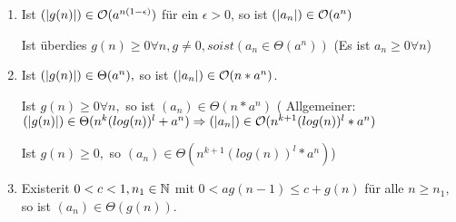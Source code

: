 \begin{enumerate}
	\item Ist $(\left|g(n)\right|) \in \mathcal{O}(a^{n(1-\epsilon)})$ für ein $ \epsilon > 0$, so ist $(\left|a_n\right|) \in \mathcal{O}(a^n)$ 
	
	Ist überdies $g(n) \geq 0 \forall n, g\neq 0, so ist (a_n \in \Theta (a^n))$ \qquad (Es ist $a_n \geq 0 \forall n$)
	
	\item Ist $(\left|g(n)\right|) \in \Theta(a^n),$ so ist $(\left|a_n\right|) \in \mathcal{O}(n*a^n) $.
	
	Ist $g(n)\geq 0 \forall n,$ so ist $ (a_n) \in \Theta (n*a^n)$ 	\Big( Allgemeiner: $(\left|g(n)\right|) \in \Theta(n^k(log(n))^l+a^n) \Rightarrow (\left|a_n\right|) \in \mathcal{O}(n^{k+1}(log(n))^l*a^n)$
	
	Ist $g(n)\geq 0,$ so $(a_n) \in \Theta(n^{k+1}(log(n))^l*a^n)$\Big)
	
	\item Existerit $0<c<1, n_1 \in \operatorname{\mathbb{N}}$ mit $0 < ag(n-1)\leq c+g(n)$ für alle $n \geq n_1,$ so ist $(a_n) \in \Theta(g(n)).$
	
	\Big[Im Fall c gilt (zur Vereinf. $n_1=1$): $g(n)\geq\frac{a}{c}\geq(\frac{a}{c})^{n-1}g(1) = (\frac{a}{c})^n * \frac{c}{a} * g(1)$
	
	$= a^n(1+\epsilon)\frac{c}{a}*g(1)$,
	
	wobei $\epsilon = - log_ac>0$.\qquad d.h. $(g(n)) \in \Omega(a^{n(1+\epsilon)})$\Big]  
\end{enumerate}